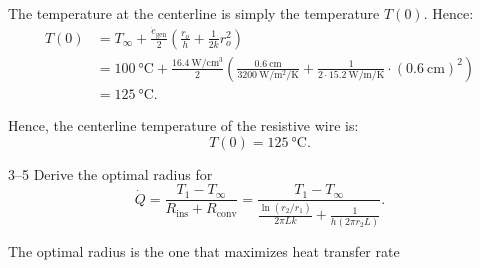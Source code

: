 \begin{derivation}
  \derivationpart

  The temperature at the centerline is simply the temperature $T(0)$.
  Hence:
  \begin{align*}
    T(0) &= T_{\infty} + \frac{\dot{e}_{\text{gen}}}{2} \left( \frac{r_o}{h} + \frac{1}{2k} r_o^2 \right) \\ 
         &= \qty{100}{\celsius} + \frac{\qty{16,4}{\W\per\cm\cubed}}{2} \left( \frac{\qty{0,6}{\cm}}{\qty{3200}{\W\per\m\squared\per\K}} + \frac{1}{2 \cdot \qty{15,2}{\W\per\m\per\K}} \cdot \left( \qty{0,6}{\cm}  \right)^2 \right) \\
         &= \qty{125}{\celsius} 
  .\end{align*}

  \begin{subresult}
    Hence, the centerline temperature of the resistive wire is:
    \begin{equation*}
      T(0) = \qty{125}{\celsius} 
    .\end{equation*}
  \end{subresult}
\end{derivation}

\begin{problem}{3--5}
  Derive the optimal radius for
  \begin{equation*}
    \dot{Q} = \frac{T_1 - T_{\infty}}{R_{\text{ins}} + R_{\text{conv}}} = \frac{T_1 - T_{\infty}}{\frac{\ln (r_2 / r_1)}{2\pi L k} + \frac{1}{h \left( 2\pi r_2 L \right)}}
  .\end{equation*}
\end{problem}

\begin{assumptions}
  \item The optimal radius is the one that maximizes heat transfer rate
\end{assumptions}


